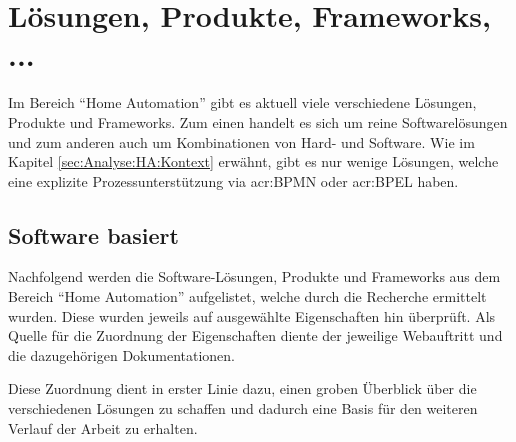 \section{Lösungen, Produkte, Frameworks, ...}\label{sec:Analyse:HA:LPF}
Im Bereich "`Home Automation"' gibt es aktuell viele verschiedene Lösungen, Produkte und Frameworks. Zum einen handelt es sich um reine Softwarelösungen und zum anderen auch um Kombinationen von Hard- und Software. Wie im Kapitel \ref{sec:Analyse:HA:Kontext}  erwähnt, gibt es nur wenige Lösungen, welche eine explizite Prozessunterstützung via \gls{acr:BPMN} oder \gls{acr:BPEL} haben.

\subsection{Software basiert}
Nachfolgend werden die Software-Lösungen, Produkte und Frameworks aus dem Bereich "`Home Automation"' aufgelistet, welche durch die Recherche ermittelt wurden. Diese wurden jeweils auf ausgewählte Eigenschaften hin überprüft. Als Quelle für die Zuordnung der Eigenschaften diente der jeweilige Webauftritt und die dazugehörigen Dokumentationen.

Diese Zuordnung dient in erster Linie dazu, einen groben Überblick über die verschiedenen Lösungen zu schaffen und dadurch eine Basis für den weiteren Verlauf der Arbeit zu erhalten.

